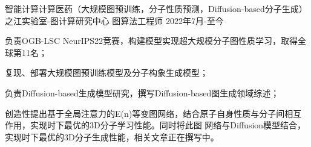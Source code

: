 \begin{cventries}
  \cventry
  {智能计算计算医药（大规模图预训练，分子性质预测，Diffusion-based分子生成）} %
  {之江实验室-图计算研究中心} %
  {图算法工程师} %
  {2022年7月-至今} %
  {
    \begin{cvitems} %
      \item {负责OGB-LSC NeurIPS22竞赛，构建模型实现超大规模分子图性质学习，取得全球第11名；}
      \item {复现、部署大规模图预训练模型及分子构象生成模型；}
      \item {负责Diffusion-based生成模型研究，撰写Diffusion-based图生成领域综述；}
      \item {创造性提出基于全局注意力的E(n)等变图网络，结合原子自身性质与分子间相互作用，实现时下最优的3D分子学习性能。同时将此图
      网络与Diffusion模型结合，实现时下最优的3D分子生成性能，相关文章正在撰写中。}
    \end{cvitems}
  }
\end{cventries}